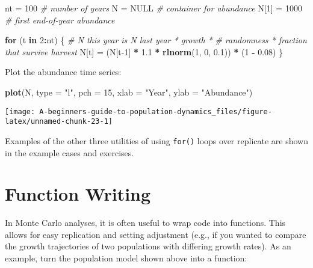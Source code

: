 \documentclass[]{book}
\newenvironment{Shaded}{\begin{snugshade}}{\end{snugshade}}
\newcommand{\CommentTok}[1]{\textcolor[rgb]{0.56,0.35,0.01}{\textit{#1}}}
\newcommand{\ControlFlowTok}[1]{\textcolor[rgb]{0.13,0.29,0.53}{\textbf{#1}}}
\newcommand{\DataTypeTok}[1]{\textcolor[rgb]{0.13,0.29,0.53}{#1}}
\newcommand{\DecValTok}[1]{\textcolor[rgb]{0.00,0.00,0.81}{#1}}
\newcommand{\FloatTok}[1]{\textcolor[rgb]{0.00,0.00,0.81}{#1}}
\newcommand{\KeywordTok}[1]{\textcolor[rgb]{0.13,0.29,0.53}{\textbf{#1}}}
\newcommand{\NormalTok}[1]{#1}
\newcommand{\OperatorTok}[1]{\textcolor[rgb]{0.81,0.36,0.00}{\textbf{#1}}}
\newcommand{\OtherTok}[1]{\textcolor[rgb]{0.56,0.35,0.01}{#1}}
\newcommand{\StringTok}[1]{\textcolor[rgb]{0.31,0.60,0.02}{#1}}
\begin{document}
\begin{Shaded}
\begin{Highlighting}[]
\NormalTok{nt =}\StringTok{ }\DecValTok{100}       \CommentTok{# number of years}
\NormalTok{N =}\StringTok{ }\OtherTok{NULL}       \CommentTok{# container for abundance}
\NormalTok{N[}\DecValTok{1}\NormalTok{] =}\StringTok{ }\DecValTok{1000}    \CommentTok{# first end-of-year abundance}

\ControlFlowTok{for}\NormalTok{ (t }\ControlFlowTok{in} \DecValTok{2}\OperatorTok{:}\NormalTok{nt) \{}
  \CommentTok{# N this year is N last year * growth *}
    \CommentTok{# randomness * fraction that survive harvest}
\NormalTok{  N[t] =}\StringTok{ }\NormalTok{(N[t}\DecValTok{-1}\NormalTok{] }\OperatorTok{*}\StringTok{ }\FloatTok{1.1} \OperatorTok{*}\StringTok{ }\KeywordTok{rlnorm}\NormalTok{(}\DecValTok{1}\NormalTok{, }\DecValTok{0}\NormalTok{, }\FloatTok{0.1}\NormalTok{)) }\OperatorTok{*}\StringTok{ }\NormalTok{(}\DecValTok{1} \OperatorTok{-}\StringTok{ }\FloatTok{0.08}\NormalTok{)}
\NormalTok{\}}
\end{Highlighting}
\end{Shaded}

Plot the abundance time series:

\begin{Shaded}
\begin{Highlighting}[]
\KeywordTok{plot}\NormalTok{(N, }\DataTypeTok{type =} \StringTok{"l"}\NormalTok{, }\DataTypeTok{pch =} \DecValTok{15}\NormalTok{, }\DataTypeTok{xlab =} \StringTok{"Year"}\NormalTok{, }\DataTypeTok{ylab =} \StringTok{"Abundance"}\NormalTok{)}
\end{Highlighting}
\end{Shaded}

\begin{center}\texttt{[image: A-beginners-guide-to-population-dynamics\_files/figure-latex/unnamed-chunk-23-1]} \end{center}

Examples of the other three utilities of using \texttt{for()} loops over replicate are shown in the example cases and exercises.

\hypertarget{adv-funcs}{%
\section{Function Writing}\label{adv-funcs}}

In Monte Carlo analyses, it is often useful to wrap code into functions. This allows for easy replication and setting adjustment (e.g., if you wanted to compare the growth trajectories of two populations with differing growth rates). As an example, turn the population model shown above into a function:
\end{document}
